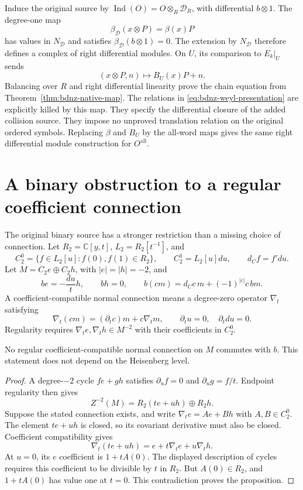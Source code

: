 Induce the original source by $\operatorname{Ind}(O)=O\otimes_R\mathcal D_R$, with differential $b\otimes1$.
The degree-one map
\[
 \beta_{\mathcal D}(x\otimes P)=\beta(x)P
\]
has values in $N_{\mathcal D}$ and satisfies $\beta_{\mathcal D}(b\otimes1)=0$.
The extension by $N_{\mathcal D}$ therefore defines a complex of right differential modules.
On $U$, its comparison to $E_k|_U$ sends
\[
 (x\otimes P,n)\longmapsto B_U(x)P+n.
\]
Balancing over $R$ and right differential linearity prove the chain equation from Theorem~\ref{thm:bdnz-native-map}.
The relations in \eqref{eq:bdnz-weyl-presentation} are explicitly killed by this map.
They specify the differential closure of the added collision source.
They impose no unproved translation relation on the original ordered symbols.
Replacing $\beta$ and $B_U$ by the all-word maps gives the same right differential module construction for $O^{\mathrm{all}}$.

\section{A binary obstruction to a regular coefficient connection}

The original binary source has a stronger restriction than a missing choice of connection.
Let $R_2=\mathbb C[y,t]$, $L_2=R_2[t^{-1}]$, and
\[
 C_2^0=\{f\in L_2[u]:f(0),f(1)\in R_2\},
 \qquad C_2^1=L_2[u]du,\qquad d_Cf=f' du.
\]
Let $M=C_2e\oplus C_2h$, with $|e|=|h|=-2$, and
\[
 be=-\frac{du}{t}h,\qquad bh=0,
 \qquad b(cm)=d_Cc\,m+(-1)^{|c|}c\,bm.
\]
A coefficient-compatible normal connection means a degree-zero operator $\nabla_t$ satisfying
\[
 \nabla_t(cm)=(\partial_tc)m+c\nabla_tm,
 \qquad \partial_tu=0,\quad\partial_tdu=0.
\]
Regularity requires $\nabla_te,\nabla_th\in M^{-2}$ with their coefficients in $C_2^0$.

\begin{proposition}\label{prop:bdnz-no-connection}
No regular coefficient-compatible normal connection on $M$ commutes with $b$.
This statement does not depend on the Heisenberg level.
\end{proposition}
\begin{proof}
A degree-$-2$ cycle $fe+gh$ satisfies $\partial_uf=0$ and $\partial_ug=f/t$.
Endpoint regularity then gives
\[
 Z^{-2}(M)=R_2(te+uh)\oplus R_2h.
\]
Suppose the stated connection exists, and write $\nabla_te=Ae+Bh$ with $A,B\in C_2^0$.
The element $te+uh$ is closed, so its covariant derivative must also be closed.
Coefficient compatibility gives
\[
 \nabla_t(te+uh)=e+t\nabla_te+u\nabla_th.
\]
At $u=0$, its $e$ coefficient is $1+tA(0)$.
The displayed description of cycles requires this coefficient to be divisible by $t$ in $R_2$.
But $A(0)\in R_2$, and $1+tA(0)$ has value one at $t=0$.
This contradiction proves the proposition.
\end{proof}

